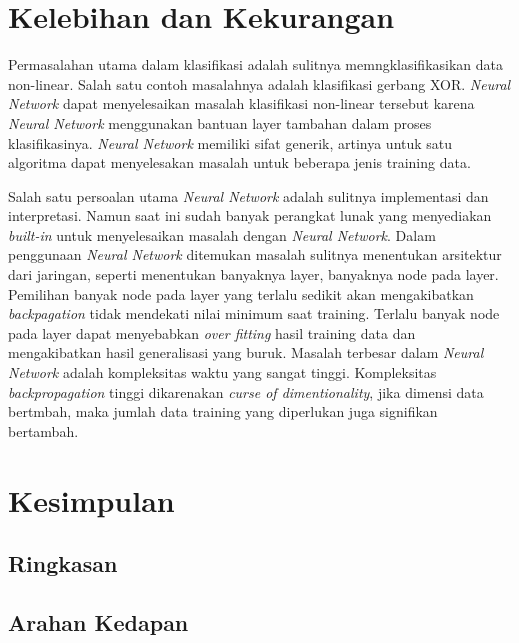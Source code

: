 \section{Kelebihan dan Kekurangan}
Permasalahan utama dalam klasifikasi adalah sulitnya memngklasifikasikan data non-linear. 
Salah satu contoh masalahnya adalah klasifikasi gerbang XOR. 
\textit{Neural Network} dapat menyelesaikan masalah klasifikasi non-linear tersebut karena \textit{Neural Network} menggunakan bantuan layer tambahan dalam proses klasifikasinya.
\textit{Neural Network} memiliki sifat generik, artinya untuk satu algoritma dapat menyelesakan masalah untuk beberapa jenis training data.

Salah satu persoalan utama \textit{Neural Network} adalah sulitnya implementasi dan interpretasi. 
Namun saat ini sudah banyak perangkat lunak yang menyediakan \textit{built-in} untuk menyelesaikan masalah dengan \textit{Neural Network}.
Dalam penggunaan \textit{Neural Network} ditemukan masalah sulitnya menentukan arsitektur dari jaringan, seperti menentukan banyaknya layer, banyaknya node pada layer.
Pemilihan banyak node pada layer yang terlalu sedikit akan mengakibatkan \textit{backpagation} tidak mendekati nilai minimum saat training.
Terlalu banyak node pada layer dapat menyebabkan \textit{over fitting} hasil training data dan mengakibatkan hasil generalisasi yang buruk.
Masalah terbesar dalam \textit{Neural Network} adalah kompleksitas waktu yang sangat tinggi. 
Kompleksitas \textit{backpropagation} tinggi dikarenakan \textit{curse of dimentionality}, jika dimensi data bertmbah, maka jumlah data training yang diperlukan juga signifikan bertambah.


\section{Kesimpulan}

	\subsection{Ringkasan}
	\lipsum

	\subsection{Arahan Kedapan}
	\lipsum[1]
